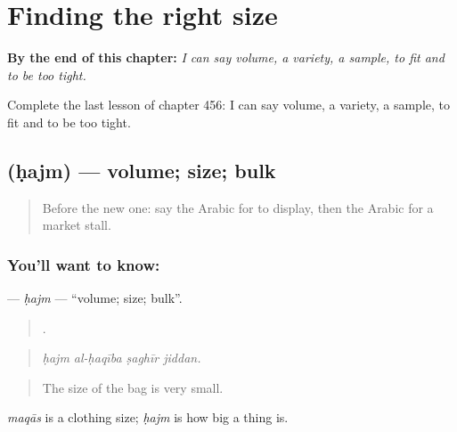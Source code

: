 
\chapter{Finding the right size}
\label{ch:ar-finding-the-right-size}

\begin{chapteropening}
\textbf{By the end of this chapter:} \emph{I can say volume, a variety, a sample, to fit and to be too tight.}

Complete the last lesson of chapter 456: I can say volume, a variety, a sample, to fit and to be too tight.
\end{chapteropening}

\section[\texorpdfstring{\ar{حجم} (ḥajm)}{حجم (ḥajm)}]{ (ḥajm) — volume; size; bulk}

\label{lesson:AR-C456-hajm}



\begin{quote}
Before the new one: say the Arabic for to display, then the Arabic for a market stall.
\end{quote}

\subsection*{You'll want to know: }
\textbf{} — \emph{ḥajm} — \textquotedblleft{}volume; size; bulk\textquotedblright{}.

\begin{quote}
   .
\end{quote}

\begin{quote}
\emph{ḥajm al-ḥaqība ṣaghīr jiddan.}
\end{quote}

\begin{quote}
The size of the bag is very small.
\end{quote}

\emph{maqās} is a clothing size; \emph{ḥajm} is how big a thing is.

